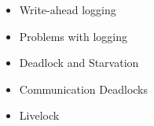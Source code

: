\documentclass[12pt]{article}
\begin{document}
\begin{itemize}
    \item Write-ahead logging
    \item Problems with logging
    \item Deadlock and Starvation
    \item Communication Deadlocks
    \item Livelock
\end{itemize}
\end{document}
